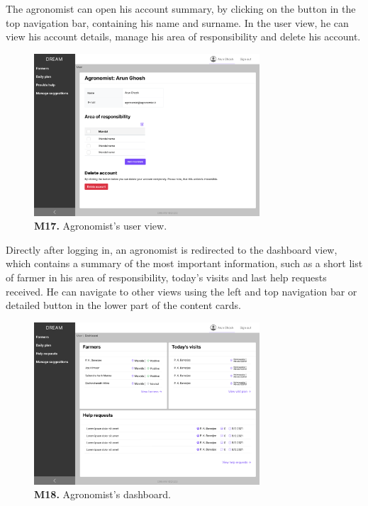 The agronomist can open his account summary, by clicking on the button in the top navigation bar, containing his name and surname. In the user view, he can view his account details, manage his area of responsibility and delete his account.
\begin{figure}[H]
    \centering
    \includegraphics[width=0.75\textwidth]{mockups/Agronomist_User.png}
    \caption{\textbf{M17.} Agronomist's user view.}
\end{figure}

Directly after logging in, an agronomist is redirected to the dashboard view, which contains a summary of the most important information, such as a short list of farmer in his area of responsibility, today’s visits and last help requests received. He can navigate to other views using the left and top navigation bar or detailed button in the lower part of the content cards.
\begin{figure}[H]
    \centering
    \includegraphics[width=0.75\textwidth]{mockups/Agronomist_Dashboard.png}
    \caption{\textbf{M18.} Agronomist's dashboard.}
\end{figure}

